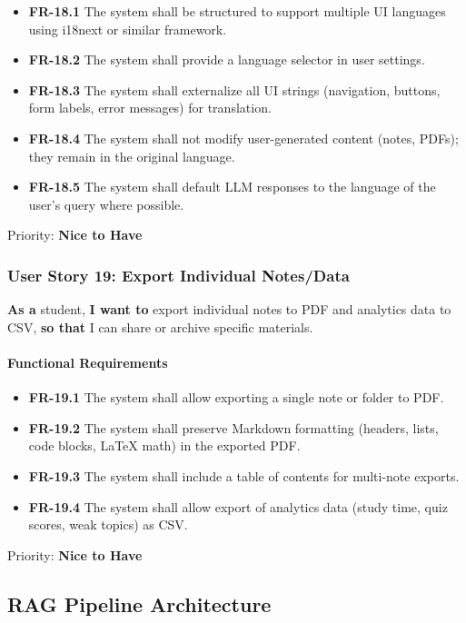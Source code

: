 \documentclass[12pt,a4paper]{article}
\begin{document}
\begin{itemize}
    \item \textbf{FR-18.1} The system shall be structured to support multiple UI languages using i18next or similar framework.
    \item \textbf{FR-18.2} The system shall provide a language selector in user settings.
    \item \textbf{FR-18.3} The system shall externalize all UI strings (navigation, buttons, form labels, error messages) for translation.
    \item \textbf{FR-18.4} The system shall not modify user-generated content (notes, PDFs); they remain in the original language.
    \item \textbf{FR-18.5} The system shall default LLM responses to the language of the user's query where possible.
\end{itemize}

Priority: \textbf{Nice to Have}

\subsubsection{User Story 19: Export Individual Notes/Data}

\textbf{As a} student, \textbf{I want to} export individual notes to PDF and analytics data to CSV, \textbf{so that} I can share or archive specific materials.

\paragraph{Functional Requirements}

\begin{itemize}
    \item \textbf{FR-19.1} The system shall allow exporting a single note or folder to PDF.
    \item \textbf{FR-19.2} The system shall preserve Markdown formatting (headers, lists, code blocks, LaTeX math) in the exported PDF.
    \item \textbf{FR-19.3} The system shall include a table of contents for multi-note exports.
    \item \textbf{FR-19.4} The system shall allow export of analytics data (study time, quiz scores, weak topics) as CSV.
\end{itemize}

Priority: \textbf{Nice to Have}

\subsection{RAG Pipeline Architecture}
\end{document}

